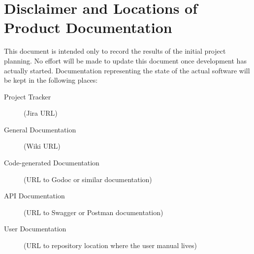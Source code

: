 \section{Disclaimer and Locations of Product Documentation}\label{sec:disclaimer}

This document is intended only to record the results of the initial project
planning. No effort will be made to update this document once development has
actually started. Documentation representing the state of the actual software
will be kept in the following places:

\begin{description}
    \item[Project Tracker] (Jira URL)
    \item[General Documentation] (Wiki URL)
    \item[Code-generated Documentation] (URL to Godoc or similar documentation)
    \item[API Documentation] (URL to Swagger or Postman documentation)
    \item[User Documentation] (URL to repository location where the user manual lives)
\end{description}
